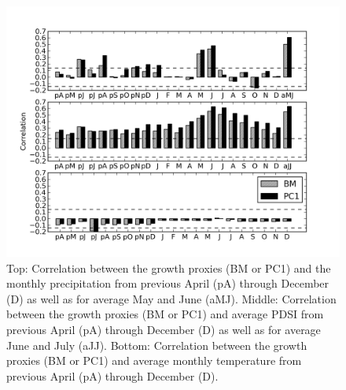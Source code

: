 \begin{figure}
\centering
\includegraphics[width=5in]{figures/climCorr.png}
\caption{Top: Correlation between the growth proxies (BM or PC1) and the monthly precipitation from previous April (pA) through December (D) as well as for average May and June (aMJ). Middle: Correlation between the growth proxies (BM or PC1) and average PDSI from previous April (pA) through December (D) as well as for average June and July (aJJ). Bottom: Correlation between the growth proxies (BM or PC1) and average monthly temperature from previous April (pA) through December (D).}
\label{fig:climCorr}
\end{figure}



